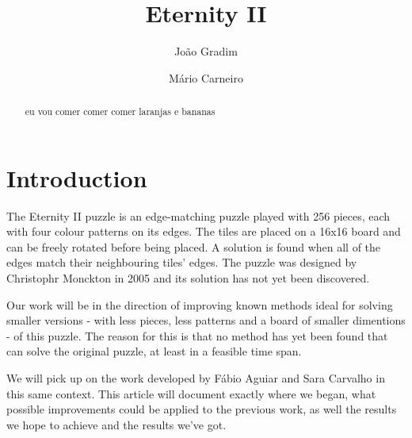 \documentclass{llncs}
\begin{document}
%
\frontmatter          %
%
\pagestyle{headings}  %
%

\mainmatter              %
%
\title{Eternity II}
%
%
\author{João Gradim \and Mário Carneiro}
%
%
%

\maketitle              %

\begin{abstract}
eu vou comer
comer
comer
laranjas e bananas
\end{abstract}
%
\section{Introduction}


The Eternity II puzzle is an edge-matching puzzle played with 256 pieces, each with four colour patterns on its edges. The tiles are placed on a 16x16 board and can be freely rotated before being placed. A solution is found when all of the edges match their neighbouring tiles' edges. The puzzle was designed by Christophr Monckton in 2005 and its solution has not yet been discovered. 

Our work will be in the direction of improving known methods ideal for solving smaller versions - with less pieces, less patterns and a board of smaller dimentions - of this puzzle. The reason for this is that no method has yet been found that can solve the original puzzle, at least in a feasible time span. 

We will pick up on the work developed by Fábio Aguiar and Sara Carvalho in this same context. This article will document exactly where we began, what possible improvements could be applied to the previous work, as well the results we hope to achieve and the results we've got.
\end{document}
